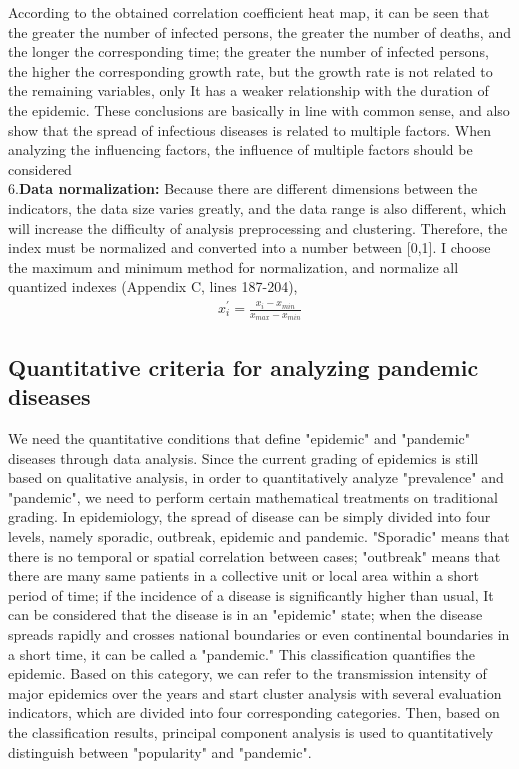 \documentclass[a4paper, 11pt,twoside=true]{scrartcl}
\begin{document}
\quad According to the obtained correlation coefficient heat map, it can be seen that the greater the number of infected persons, the greater the number of deaths, and the longer the corresponding time; the greater the number of infected persons, the higher the corresponding growth rate, but the growth rate is not related to the remaining variables, only It has a weaker relationship with the duration of the epidemic. These conclusions are basically in line with common sense, and also show that the spread of infectious diseases is related to multiple factors. When analyzing the influencing factors, the influence of multiple factors should be considered\\
6.\textbf{Data normalization: }Because there are different dimensions between the indicators, the data size varies greatly, and the data range is also different, which will increase the difficulty of analysis preprocessing and clustering. Therefore, the index must be normalized and converted into a number between [0,1]. I choose the maximum and minimum method for normalization, and normalize all quantized indexes (Appendix C, lines 187-204),
$$
\begin{aligned}
x_i^{'}=\frac{x_i-x_{min}}{x_{max}-x_{min}}
\end{aligned}
$$

\subsection{Quantitative criteria for analyzing pandemic diseases}
\qquad We need the quantitative conditions that define "epidemic" and "pandemic" diseases through data analysis. Since the current grading of epidemics is still based on qualitative analysis, in order to quantitatively analyze "prevalence" and "pandemic", we need to perform certain mathematical treatments on traditional grading. In epidemiology, the spread of disease can be simply divided into four levels, namely sporadic, outbreak, epidemic and pandemic. "Sporadic" means that there is no temporal or spatial correlation between cases; "outbreak" means that there are many same patients in a collective unit or local area within a short period of time; if the incidence of a disease is significantly higher than usual, It can be considered that the disease is in an "epidemic" state; when the disease spreads rapidly and crosses national boundaries or even continental boundaries in a short time, it can be called a "pandemic." This classification quantifies the epidemic. Based on this category, we can refer to the transmission intensity of major epidemics over the years and start cluster analysis with several evaluation indicators, which are divided into four corresponding categories. Then, based on the classification results, principal component analysis is used to quantitatively distinguish between "popularity" and "pandemic".
\end{document}
